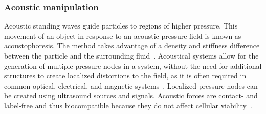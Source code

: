 

\subsubsection{Acoustic manipulation}\label{subsubsec:acousticManipulation}
Acoustic standing waves guide particles to regions of higher pressure. This movement of an object in response to an acoustic pressure field is known as acoustophoresis. The method takes advantage of a density and stiffness difference between the particle and the surrounding fluid~\cite{Groeschl1998,Groeschl1998a}. Acoustical systems allow for the generation of multiple pressure nodes in a system, without the need for additional structures to create localized distortions to the field, as it is often required in common optical, electrical, and magnetic systems~\cite{Neild2007}. Localized pressure nodes can be created using ultrasound sources and signals. Acoustic forces are contact- and label-free and thus biocompatible because they do not affect cellular viability~\cite{Lenshof2010}.

